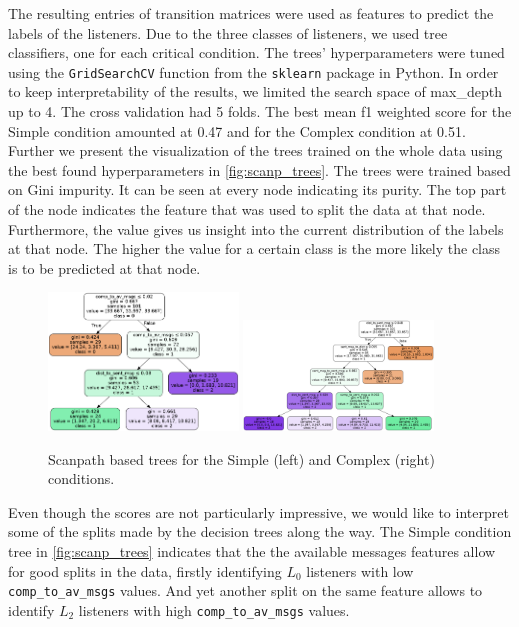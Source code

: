 The resulting entries of transition matrices were used as features to predict the labels of the listeners. Due to the three classes of listeners, we used tree classifiers, one for each critical condition. The trees' hyperparameters were tuned using the \texttt{GridSearchCV} function from the \texttt{sklearn} package in Python. 
In order to keep interpretability of the results, we limited the search space of max\_depth up to 4. The cross validation had 5 folds. The best mean f1 weighted score for the Simple condition amounted at 0.47 and for the Complex condition at 0.51. Further we present the visualization of the trees trained on the whole data using the best found hyperparameters in \autoref{fig:scanp_trees}. The trees were trained based on Gini impurity. It can be seen at every node indicating its purity. The top part of the node indicates the feature that was used to split the data at that node. Furthermore, the value gives us insight into the current distribution of the labels at that node. The higher the value for a certain class is the more likely the class is to be predicted at that node.

\begin{figure}
    \centering
    \includegraphics[width=0.45\textwidth]{images/tree_classifier_scanp_simple.png}
    \includegraphics[width=0.45\textwidth]{images/tree_classifier_scanp_complex.png}
    \caption{Scanpath based trees for the Simple (left) and Complex (right) conditions.}
    \label{fig:scanp_trees}
\end{figure}

Even though the scores are not particularly impressive, we would like to interpret some of the splits made by the decision trees along the way. The Simple condition tree in \autoref{fig:scanp_trees} indicates that the the available messages features allow for good splits in the data, 
firstly identifying $L_0$ listeners with low \texttt{comp\_to\_av\_msgs} values. And yet another split on the same feature allows to identify $L_2$ listeners with high \texttt{comp\_to\_av\_msgs} values.

